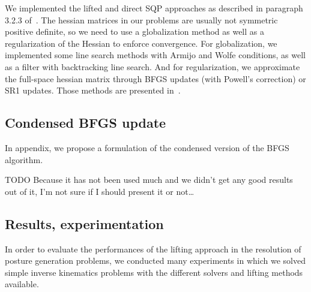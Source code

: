 We implemented the lifted and direct SQP approaches as described in paragraph 3.2.3 of~\cite{Albersmeyer:2010:LNM:1958447.1958472}.
The hessian matrices in our problems are usually not symmetric positive definite, so we need to use a globalization method as well as a regularization of the Hessian to enforce convergence.
For globalization, we implemented some line search methods with Armijo and Wolfe conditions, as well as a filter with backtracking line search.
And for regularization, we approximate the full-space hessian matrix through BFGS updates (with Powell's correction) or SR1 updates.
Those methods are presented in~\cite{bonnans:springer:2002}.

\subsection{Condensed BFGS update}
\label{subsec:condensed_bfgs_update}
In appendix, we propose a formulation of the condensed version of the BFGS algorithm.

TODO Because it has not been used much and we didn't get any good results out of it, I'm not sure if I should present it or not\ldots

\subsection{Results, experimentation}
\label{subsec:Results}

In order to evaluate the performances of the lifting approach in the resolution of posture generation problems, we conducted many experiments in which we solved simple inverse kinematics problems with the different solvers and lifting methods available.

